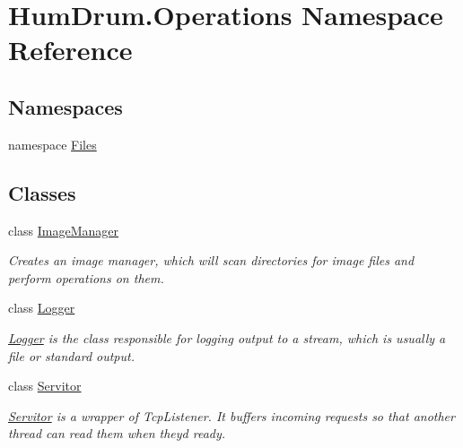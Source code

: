 \hypertarget{namespaceHumDrum_1_1Operations}{}\section{Hum\+Drum.\+Operations Namespace Reference}
\label{namespaceHumDrum_1_1Operations}
\subsection*{Namespaces}
\begin{DoxyCompactItemize}
\item 
namespace \hyperlink{namespaceHumDrum_1_1Operations_1_1Files}{Files}
\end{DoxyCompactItemize}
\subsection*{Classes}
\begin{DoxyCompactItemize}
\item 
class \hyperlink{classHumDrum_1_1Operations_1_1ImageManager}{Image\+Manager}
\begin{DoxyCompactList}\small\item\em Creates an image manager, which will scan directories for image files and perform operations on them. \end{DoxyCompactList}\item 
class \hyperlink{classHumDrum_1_1Operations_1_1Logger}{Logger}
\begin{DoxyCompactList}\small\item\em \hyperlink{classHumDrum_1_1Operations_1_1Logger}{Logger} is the class responsible for logging output to a stream, which is usually a file or standard output. \end{DoxyCompactList}\item 
class \hyperlink{classHumDrum_1_1Operations_1_1Servitor}{Servitor}
\begin{DoxyCompactList}\small\item\em \hyperlink{classHumDrum_1_1Operations_1_1Servitor}{Servitor} is a wrapper of Tcp\+Listener. It buffers incoming requests so that another thread can read them when they\textquotesingle{}d ready. \end{DoxyCompactList}\end{DoxyCompactItemize}

